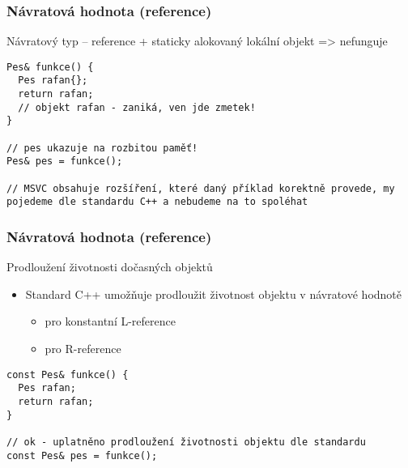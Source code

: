 \begin{frame}[fragile]
\frametitle{Návratová hodnota (reference)}
\begin{bitemize}
\item Návratový typ -- reference  + staticky alokovaný lokální objekt => nefunguje
\end{bitemize}

\begin{noblock}
\begin{lstlisting}
Pes& funkce() {
  Pes rafan{};
  return rafan;
  // objekt rafan - zaniká, ven jde zmetek!
}

// pes ukazuje na rozbitou paměť!
Pes& pes = funkce();

// MSVC obsahuje rozšíření, které daný příklad korektně provede, my pojedeme dle standardu C++ a nebudeme na to spoléhat
\end{lstlisting}
\end{noblock}
\end{frame}







\begin{frame}[fragile]
\frametitle{Návratová hodnota (reference)}

\begin{bonusblock}{Prodloužení životnosti dočasných objektů}
\begin{itemize}
\item Standard C++ umožňuje prodloužit životnost objektu v návratové hodnotě
\begin{itemize}
\item pro konstantní L-reference
\item pro R-reference
\end{itemize}
\end{itemize}
\end{bonusblock}

\begin{bonusblock}{}
\begin{lstlisting}
const Pes& funkce() {
  Pes rafan;
  return rafan;
}

// ok - uplatněno prodloužení životnosti objektu dle standardu
const Pes& pes = funkce();

\end{lstlisting}
\end{bonusblock}
\end{frame}



